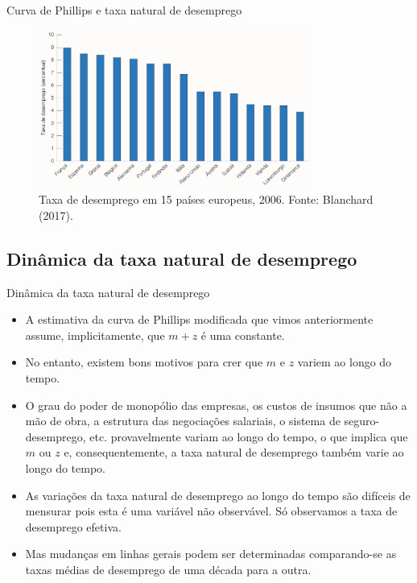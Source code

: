\documentclass[10pt]{beamer}
\begin{document}
\begin{frame}{Curva de Phillips e taxa natural de desemprego}
    \begin{figure}
        \centering
        \includegraphics[width=0.8\textwidth]{./figures/macro14_fig4.JPG}
        \caption{Taxa de desemprego em 15 países europeus, 2006. Fonte: Blanchard (2017).}
        \label{fig3}
    \end{figure}
\end{frame}

\subsection{Dinâmica da taxa natural de desemprego}
\begin{frame}{Dinâmica da taxa natural de desemprego}
    \begin{itemize}
        \item A estimativa da curva de Phillips modificada que vimos anteriormente assume, implicitamente, que $m + z$ é uma constante.
        \bigskip
        \item No entanto, existem bons motivos para crer que $m$ e $z$ variem ao longo do tempo.
        \bigskip
        \item O grau do poder de monopólio das empresas, os custos de insumos que não a mão de obra, a estrutura das negociações salariais, o sistema de seguro-desemprego, etc. provavelmente variam ao longo do tempo, o que implica que $m$ ou $z$ e, consequentemente, a taxa natural de desemprego também varie ao longo do tempo.
        \bigskip
        \item As variações da taxa natural de desemprego ao longo do tempo são difíceis de mensurar pois esta é uma variável não observável. Só observamos a taxa de desemprego efetiva.
        \bigskip
        \item Mas mudanças em linhas gerais podem ser determinadas comparando-se as taxas médias de desemprego de uma década para a outra.
    \end{itemize}
\end{frame}
\end{document}
